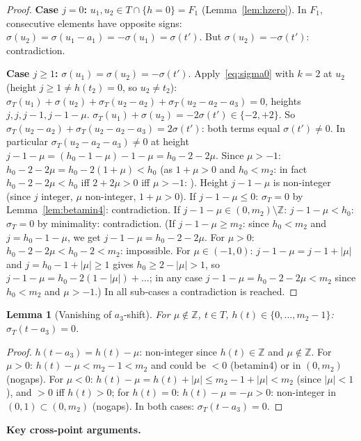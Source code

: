\documentclass{article}
\newtheorem{lemma}{Lemma}
\begin{document}
\begin{proof}
\textbf{Case $j=0$:}
$u_1,u_2\in T\cap\{h=0\}=F_1$ (Lemma~\ref{lem:hzero}).
In $F_1$, consecutive elements have opposite signs:
$\sigma(u_2)=\sigma(u_1-a_1)=-\sigma(u_1)=\sigma(t')$.
But $\sigma(u_2)=-\sigma(t')$: contradiction.

\textbf{Case $j\ge 1$:}
$\sigma(u_1)=\sigma(u_2)=-\sigma(t')$.
Apply~\eqref{eq:sigma0} with $k=2$ at $u_2$ (height $j\ge 1\ne h(t_2)=0$, so $u_2\ne t_2$):
$\sigma_T(u_1)+\sigma(u_2)+\sigma_T(u_2-a_2)+\sigma_T(u_2-a_2-a_3)=0$,
heights $j,j,j-1,j-1-\mu$.
$\sigma_T(u_1)+\sigma(u_2)=-2\sigma(t')\in\{-2,+2\}$.
So $\sigma_T(u_2-a_2)+\sigma_T(u_2-a_2-a_3)=2\sigma(t')$:
both terms equal $\sigma(t')\ne 0$.
In particular $\sigma_T(u_2-a_2-a_3)\ne 0$ at height $j-1-\mu=(h_0-1-\mu)-1-\mu=h_0-2-2\mu$.
Since $\mu>-1$: $h_0-2-2\mu=h_0-2(1+\mu)<h_0$ (as $1+\mu>0$ and $h_0<m_2$: in fact $h_0-2-2\mu<h_0$ iff $2+2\mu>0$ iff $\mu>-1$: \checkmark).
Height $j-1-\mu$ is non-integer (since $j$ integer, $\mu$ non-integer, $1+\mu>0$).
If $j-1-\mu\le 0$: $\sigma_T=0$ by Lemma~\ref{lem:betamin4}: contradiction.
If $j-1-\mu\in(0,m_2)\setminus\mathbb Z$: $j-1-\mu<h_0$: $\sigma_T=0$ by minimality: contradiction.
\textup{(}If $j-1-\mu\ge m_2$: since $h_0<m_2$ and $j=h_0-1-\mu$, we get $j-1-\mu=h_0-2-2\mu$.
For $\mu>0$: $h_0-2-2\mu<h_0-2<m_2$: impossible.
For $\mu\in(-1,0)$: $j-1-\mu=j-1+|\mu|$ and $j=h_0-1+|\mu|\ge 1$ gives $h_0\ge 2-|\mu|>1$,
so $j-1-\mu=h_0-2(1-|\mu|)+...$; in any case $j-1-\mu=h_0-2-2\mu<m_2$ since $h_0<m_2$ and $\mu>-1$.\textup{)}
In all sub-cases a contradiction is reached.
\end{proof}

\begin{lemma}[Vanishing of $a_3$-shift]\label{lem:a3vanish}
For $\mu\notin\mathbb{Z}$, $t\in T$, $h(t)\in\{0,\dots,m_2-1\}$:
$\sigma_T(t-a_3)=0$.
\end{lemma}
\begin{proof}
$h(t-a_3)=h(t)-\mu$: non-integer since $h(t)\in\mathbb Z$ and $\mu\notin\mathbb Z$.
For $\mu>0$: $h(t)-\mu<m_2-1<m_2$ and could be $<0$ (betamin4) or in $(0,m_2)$ (nogaps).
For $\mu<0$: $h(t)-\mu=h(t)+|\mu|\le m_2-1+|\mu|<m_2$ (since $|\mu|<1$), and $>0$ iff $h(t)>0$; for $h(t)=0$: $h(t)-\mu=-\mu>0$: non-integer in $(0,1)\subset(0,m_2)$ (nogaps).
In both cases: $\sigma_T(t-a_3)=0$.
\end{proof}

\medskip
\noindent\textbf{Key cross-point arguments.}
\end{document}
